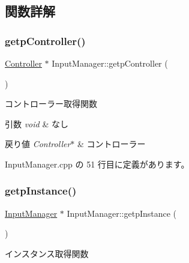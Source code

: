 \subsection{関数詳解}
\mbox{\label{class_input_manager_a8b782bf1947449448181a9cf0194c3bc}} 
\subsubsection{\texorpdfstring{getp\+Controller()}{getpController()}}
{\footnotesize\ttfamily \mbox{\hyperlink{class_controller}{Controller}} $\ast$ Input\+Manager\+::getp\+Controller (\begin{DoxyParamCaption}{ }\end{DoxyParamCaption})}



コントローラー取得関数 


\begin{DoxyParams}{引数}
{\em void} & なし \\
\hline
\end{DoxyParams}

\begin{DoxyRetVals}{戻り値}
{\em Controller$\ast$} & コントローラー \\
\hline
\end{DoxyRetVals}


 Input\+Manager.\+cpp の 51 行目に定義があります。

\mbox{\label{class_input_manager_a0d02e30524633768b3cfa0ea94dac228}} 
\subsubsection{\texorpdfstring{getp\+Instance()}{getpInstance()}}
{\footnotesize\ttfamily \mbox{\hyperlink{class_input_manager}{Input\+Manager}} $\ast$ Input\+Manager\+::getp\+Instance (\begin{DoxyParamCaption}{ }\end{DoxyParamCaption})\hspace{0.3cm}{\ttfamily [static]}}



インスタンス取得関数 


